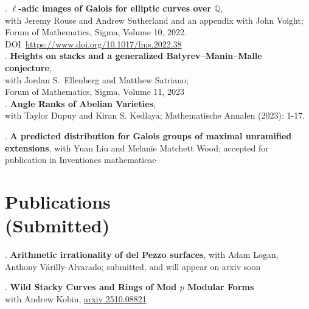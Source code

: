 \documentclass[margin,line]{res}
\newcounter{pubs}
\begin{document}
\begin{resume}
 .  \textbf{$\ell$-adic images of Galois for elliptic curves over $\mathbb{Q}$},\\
with Jeremy Rouse and Andrew Sutherland and an appendix with John Voight;\\
Forum of Mathematics, Sigma, Volume 10, 2022. DOI~\url{https://www.doi.org/10.1017/fms.2022.38}
\medskip\\
 .  \textbf{Heights on stacks and a generalized Batyrev--Manin--Malle conjecture},\\
with Jordan S.~Ellenberg and Matthew Satriano;\\
Forum of Mathematics, Sigma, Volume 11, 2023
\medskip\\
 .  \textbf{Angle Ranks of Abelian Varieties},\\ with Taylor Dupuy and Kiran S. Kedlaya; Mathematische Annalen (2023): 1-17.

 .  \textbf{A predicted distribution for Galois groups of maximal unramified extensions}, with Yuan Liu and Melanie Matchett Wood; accepted for publication in Inventiones mathematicae







\vspace{-7pt}
\section{\sc Publications \\ {(Submitted)}}

 .  \textbf{Arithmetic irrationality of del Pezzo surfaces}, with Adam Logan, Anthony V\'arilly-Alvarado; submitted, and will appear on arxiv soon

 .  \textbf{Wild Stacky Curves and Rings of Mod $p$ Modular Forms}\\
with Andrew Kobin, \href{http://arxiv.org/abs/2510.08821}{arxiv 2510.08821}


\end{resume}
\end{document}
